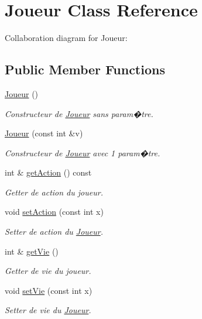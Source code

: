 \hypertarget{classJoueur}{}\section{Joueur Class Reference}
\label{classJoueur}


Collaboration diagram for Joueur\+:
\subsection*{Public Member Functions}
\begin{DoxyCompactItemize}
\item 
\hyperlink{classJoueur_add6c98be3020651d84f6d75ccc1d867e}{Joueur} ()
\begin{DoxyCompactList}\small\item\em Constructeur de \hyperlink{classJoueur}{Joueur} sans param�tre. \end{DoxyCompactList}\item 
\hyperlink{classJoueur_a8a04b26540b867954b0c97710cf64213}{Joueur} (const int \&v)
\begin{DoxyCompactList}\small\item\em Constructeur de \hyperlink{classJoueur}{Joueur} avec 1 param�tre. \end{DoxyCompactList}\item 
int \& \hyperlink{classJoueur_a71c07a51eaca56dd5d365ddb48fab5f8}{get\+Action} () const
\begin{DoxyCompactList}\small\item\em Getter de action du joueur. \end{DoxyCompactList}\item 
void \hyperlink{classJoueur_a72a334ac1d22b59bbe945d84de288b28}{set\+Action} (const int x)
\begin{DoxyCompactList}\small\item\em Setter de action du \hyperlink{classJoueur}{Joueur}. \end{DoxyCompactList}\item 
int \& \hyperlink{classJoueur_ab272a17d9e5b530e87fc725e4e2009c8}{get\+Vie} ()
\begin{DoxyCompactList}\small\item\em Getter de vie du joueur. \end{DoxyCompactList}\item 
void \hyperlink{classJoueur_ab417539a787e7157bf8cbbfaa1d309c7}{set\+Vie} (const int x)
\begin{DoxyCompactList}\small\item\em Setter de vie du \hyperlink{classJoueur}{Joueur}. \end{DoxyCompactList}\item 

\end{DoxyCompactItemize}
